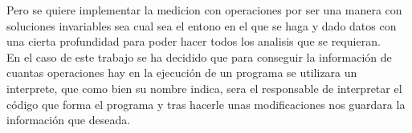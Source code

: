  
Pero se quiere implementar la medicion con operaciones por ser una  manera con soluciones invariables sea cual sea el entono en el que se haga y dado datos con una cierta profundidad para poder hacer todos los analisis que se requieran.\\

En el caso de este trabajo se ha decidido que para conseguir la información de cuantas operaciones hay en la ejecución de un programa se utilizara un interprete, que como bien su nombre indica, sera el responsable de interpretar el código que forma el programa y tras hacerle unas modificaciones nos guardara  la información que deseada. 



